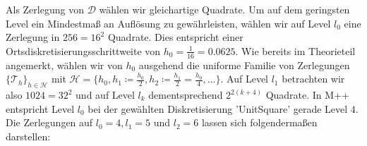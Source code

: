 Als Zerlegung von $ \mathcal{D} $ wählen wir gleichartige Quadrate. Um auf dem geringsten Level ein Mindestmaß an Auflösung zu gewährleisten, wählen wir auf Level $ l_0 $ eine Zerlegung in $ 256 = 16^2 $ Quadrate. Dies entspricht einer Ortsdiskretisierungsschrittweite von $ h_0 = \frac{1}{16} = 0.0625 $. Wie bereits im Theorieteil angemerkt, wählen wir von $ h_0 $ ausgehend die uniforme Familie von Zerlegungen $ \{\mathcal{T}_h \}_{h \in \mathcal{H}} $ mit $ \mathcal{H} = \{ h_0 , h_1 \coloneqq \frac{h_0}{2},h_2 \coloneqq \frac{h_1}{2} = \frac{h_0}{4}, \dots \} $. Auf Level $ l_1 $ betrachten wir also $ 1024 = 32^2 $ und auf Level $ l_k $ dementsprechend $ 2^{2(k+4)} $ Quadrate. 
In M++ entspricht Level $ l_0 $ bei der gewählten Diskretisierung 'UnitSquare' gerade Level $ 4 $. Die Zerlegungen auf $ l_0 = 4, l_1 = 5 $ und $ l_2 = 6 $ lassen sich folgendermaßen darstellen:
\begin{figure}[H]
	\centering
\end{figure}
